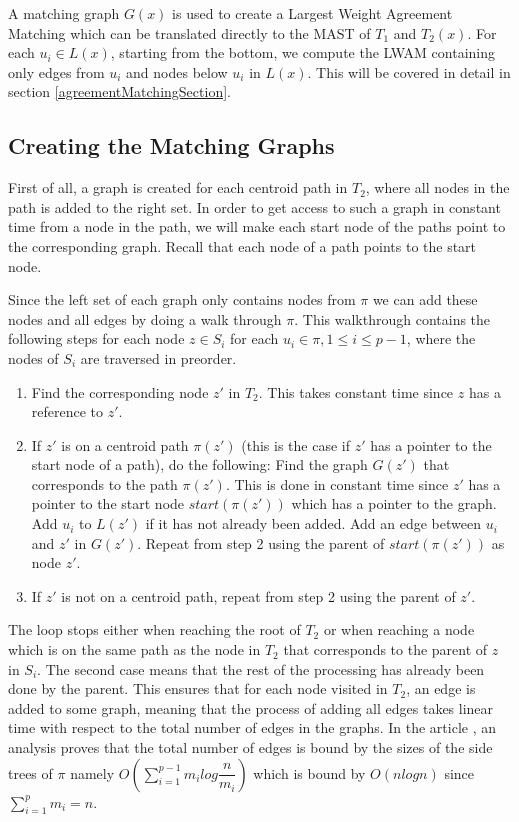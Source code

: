 A matching graph $G(x)$ is used to create a Largest Weight Agreement Matching which can be translated directly to the MAST of $T_1$ and $T_2(x)$. For each $u_i \in L(x)$, starting from the bottom, we compute the LWAM containing only edges from $u_i$ and nodes below $u_i$ in $L(x)$. This will be covered in detail in section \ref{agreementMatchingSection}.

\subsection{Creating the Matching Graphs}
First of all, a graph is created for each centroid path in $T_2$, where all nodes in the path is added to the right set. In order to get access to such a graph in constant time from a node in the path, we will make each start node of the paths point to the corresponding graph. Recall that each node of a path points to the start node.

Since the left set of each graph only contains nodes from $\pi$ we can add these nodes and all edges by doing a walk through $\pi$. This walkthrough contains the following steps for each node $z \in S_i$ for each $u_i \in \pi, 1 \le i \le p-1$, where the nodes of $S_i$ are traversed in preorder.

\begin{enumerate}
	\item Find the corresponding node $z'$ in $T_2$.
	\subitem This takes constant time since $z$ has a reference to $z'$.
	\item If $z'$ is on a centroid path $\pi(z')$ (this is the case if $z'$ has a pointer to the start node of a path), do the following:
	\subitem Find the graph $G(z')$ that corresponds to the path $\pi(z')$. This is done in constant time since $z'$ has a pointer to the start node $start(\pi(z'))$ which has a pointer to the graph.
	\subitem Add $u_i$ to $L(z')$ if it has not already been added.
	\subitem Add an edge between $u_i$ and $z'$ in $G(z')$.
	\subitem Repeat from step 2 using the parent of $start(\pi(z'))$ as node $z'$.
	\item If $z'$ is not on a centroid path, repeat from step 2 using the parent of $z'$.
\end{enumerate}
The loop stops either when reaching the root of $T_2$ or when reaching a node which is on the same path as the node in $T_2$ that corresponds to the parent of $z$ in $S_i$. The second case means that the rest of the processing has already been done by the parent. This ensures that for each node visited in $T_2$, an edge is added to some graph, meaning that the process of adding all edges takes linear time with respect to the total number of edges in the graphs. In the article \cite{nlogn}, an analysis proves that the total number of edges is bound by the sizes of the side trees of $\pi$ namely $O(\sum_{i=1}^{p-1}m_ilog\dfrac{n}{m_i})$ which is bound by $O(nlogn)$ since $\sum_{i=1}^{p} m_i = n$.


